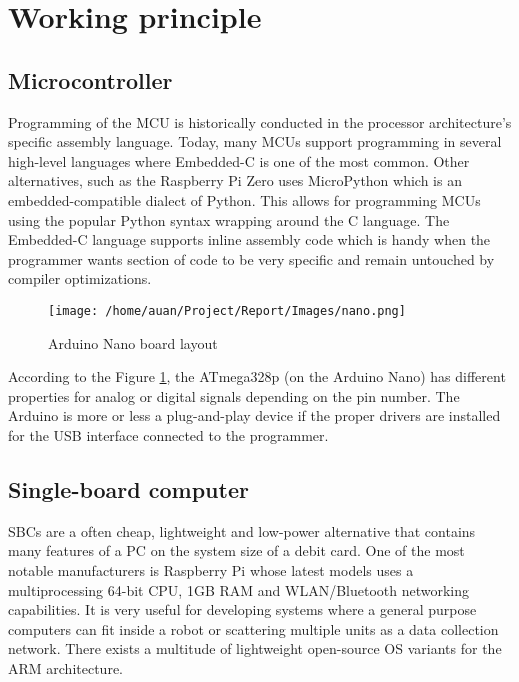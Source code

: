 \section{Working principle}%
\label{sec:working_principle}

\subsection{Microcontroller}%
\label{sub:microcontroller}
Programming of the MCU is historically conducted in the processor architecture's specific assembly language. Today, many MCUs support programming in several high-level languages where Embedded-C is one of the most common. Other alternatives, such as the Raspberry Pi Zero uses MicroPython which is an embedded-compatible dialect of Python. This allows for programming MCUs using the popular Python syntax wrapping around the C language. The Embedded-C language supports inline assembly code which is handy when the programmer wants section of code to be very specific and remain untouched by compiler optimizations.

\begin{figure}[h]
  \centering
  \texttt{[image: /home/auan/Project/Report/Images/nano.png]}
  \caption{Arduino Nano board layout \cite{PinoutNANO}}
  \label{fig:nano}
\end{figure}

According to the Figure \ref{fig:nano}, the ATmega328p (on the Arduino Nano) has different properties for analog or digital signals depending on the pin number. The Arduino is more or less a plug-and-play device if the proper drivers are installed for the USB interface connected to the programmer.

\subsection{Single-board computer}%
\label{sub:single_board_computer}
SBCs are a often cheap, lightweight and low-power alternative that contains many features of a PC on the system size of a debit card. One of the most notable manufacturers is Raspberry Pi whose latest models uses a multiprocessing 64-bit CPU, 1GB RAM and WLAN/Bluetooth networking capabilities. It is very useful for developing systems where a general purpose computers can fit inside a robot or scattering multiple units as a data collection network. There exists a multitude of lightweight open-source OS variants for the ARM architecture.

